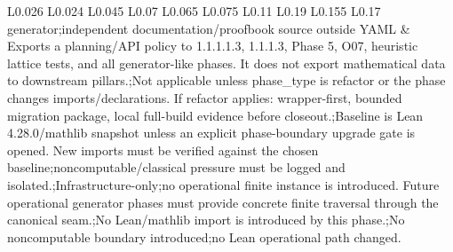 \begin{longtable}{L{0.026\linewidth} L{0.024\linewidth} L{0.045\linewidth} L{0.07\linewidth} L{0.065\linewidth} L{0.075\linewidth} L{0.11\linewidth} L{0.19\linewidth} L{0.155\linewidth} L{0.17\linewidth}}
generator;\newline independent documentation/\allowbreak{}proofbook source outside YAML & Exports a planning/\allowbreak{}API policy to 1.1.1.1.3, 1.1.1.3, Phase 5, O07, heuristic lattice tests, and all generator-like phases. It does not export mathematical data to downstream pillars.;\newline Not applicable unless phase\_type is refactor or the phase changes imports/\allowbreak{}declarations. If refactor applies: wrapper-first, bounded migration package, local full-build evidence before closeout.;\newline Baseline is Lean 4.28.0/\allowbreak{}mathlib snapshot unless an explicit phase-boundary upgrade gate is opened. New imports must be verified against the chosen baseline;\newline noncomputable/\allowbreak{}classical pressure must be logged and isolated.;\newline Infrastructure-only;\newline no operational finite instance is introduced. Future operational generator phases must provide concrete finite traversal through the canonical seam.;\newline No Lean/\allowbreak{}mathlib import is introduced by this phase.;\newline No noncomputable boundary introduced;\newline no Lean operational path changed.\\
\hline
\addlinespace[0.24em]

\end{longtable}
